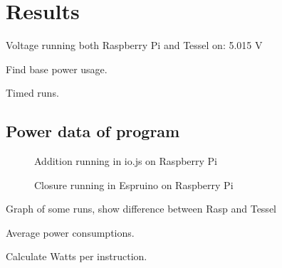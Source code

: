 \chapter{Results}
\label{ch:chapter3}

Voltage running both Raspberry Pi and Tessel on: 5.015 V

Find base power usage.

Timed runs.

\section{Power data of program}
\begin{figure}[ht]
\centering
{}
\caption{Addition running in io.js on Raspberry Pi}
\label{fig:addraspio}
\end{figure}

\begin{figure}[ht]
\centering
{}
\caption{Closure running in Espruino on Raspberry Pi}
\label{fig:closesp}
\end{figure}


Graph of some runs, show difference between Rasp and Tessel


Average power consumptions.

Calculate Watts per instruction.